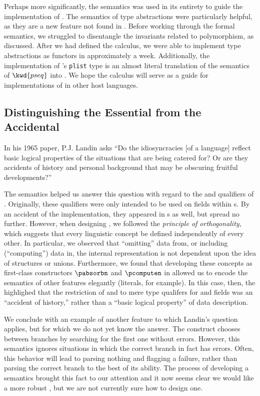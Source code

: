 Perhaps more significantly, the semantics was used in its entirety to guide the implementation of \padsml{}. The semantics of type abstractions were particularly helpful, as they are a new feature not found in \padsc{}. Before working through the formal semantics, we struggled to disentangle the invariants related to polymorphism, as discussed. After we had defined the calculus, we were able to implement type abstractions as \ocaml{} functors in approximately a week.  Additionally, the implementation of \padsml{}'s \texttt{plist} type is an almost literal translation of the semantics of $\kwd{pseq}$ into \ocaml{}.
We hope the calculus will serve as a guide for implementations of \pads{} in other host languages.

\subsection{Distinguishing the Essential from the Accidental}

In his 1965 paper, P.J. Landin asks ``Do the idiosyncracies [of a
language] reflect basic logical properties of the situations that are
being catered for?  Or are they accidents of history and personal
background that may be obscuring fruitful developments?''  

The semantics helped us answer this question with regard to the
\Pomit{} and \Pcompute{} qualifiers of \padsc{}.  Originally, these
qualifiers were only intended to be used on fields within \Pstruct{}s.
By an accident of the implementation, they appeared in \Punion{}s as
well, but spread no further. However, when designing \ddc{}, we
followed the {\em principle of orthogonality}, which suggests that
every linguistic concept be defined independently of every other.  In
particular, we observed that ``omitting'' data from, or including
(``computing'') data in, the internal representation is not dependent
upon the idea of structures or unions.  Furthermore, we found that
developing these concepts as first-class constructors $\pabsorbn$ and
$\pcomputen$ in \ddc{} allowed us to encode the semantics of other
\padsc{} features elegantly (literals, for example).  In this case, then, the
\ddc{} highlighed that the restriction of \Pomit{} and \Pcompute{} to
mere type qualifers for \Punion{} and \Pstruct{} fields was an
``accident of history,'' rather than a ``basic logical property'' of
data description.

We conclude with an example of another feature to which Landin's
question applies, but for which we do not yet know the answer. The \Punion{}
construct chooses between branches by searching for the first one
without errors. However, this semantics ignores situations in which
the correct branch in fact has errors. Often, this behavior will lead
to parsing nothing and flagging a failure, rather than parsing the
correct branch to the best of its ability.  The process of
developing a semantics brought this fact to our attention and
it now seems clear we would like a more robust
\Punion, but we are not currently sure how to design one. 

